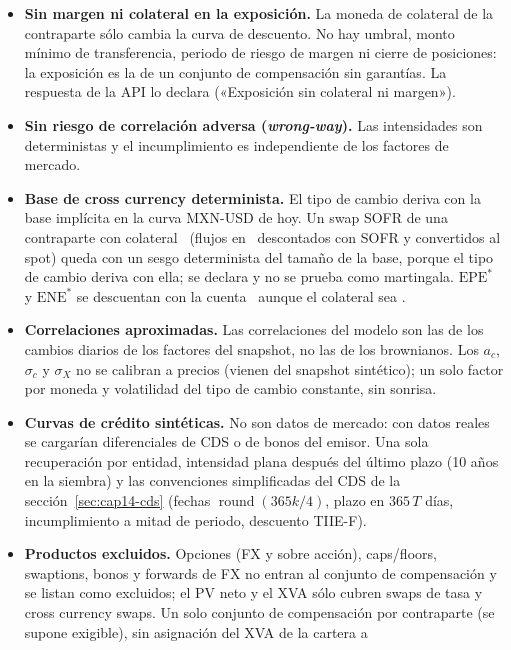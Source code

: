 \begin{limites}
  \begin{itemize}
    \item \textbf{Sin margen ni colateral en la exposición.} La moneda de colateral de la contraparte sólo cambia la
          curva de descuento. No hay umbral, monto mínimo de transferencia, periodo de riesgo de margen ni cierre de
          posiciones: la exposición es la de un conjunto de compensación sin garantías. La respuesta de la API lo declara
          («Exposición sin colateral ni margen»).
    \item \textbf{Sin riesgo de correlación adversa (\emph{wrong-way}).} Las intensidades son deterministas y el incumplimiento es
          independiente de los factores de mercado.
    \item \textbf{Base de cross currency determinista.} El tipo de cambio deriva con la base implícita en la curva MXN-USD de hoy.
          Un swap SOFR de una contraparte con colateral \MXN\ (flujos en \USD\ descontados con SOFR y convertidos al spot)
          queda con un sesgo determinista del tamaño de la base, porque el tipo de cambio deriva con ella; se declara y no se prueba
          como martingala. $\mathrm{EPE}^*$ y $\mathrm{ENE}^*$ se descuentan con la cuenta \cTIIE\ aunque el colateral sea \USD.
    \item \textbf{Correlaciones aproximadas.} Las correlaciones del modelo son las de los cambios diarios de los factores del snapshot,
          no las de los brownianos. Los $a_c$, $\sigma_c$ y $\sigma_X$ no se calibran a precios (vienen del snapshot sintético); un solo factor por
          moneda y volatilidad del tipo de cambio constante, sin sonrisa.
    \item \textbf{Curvas de crédito sintéticas.} No son datos de mercado: con datos reales se cargarían diferenciales de CDS o de bonos del
          emisor. Una sola recuperación por entidad, intensidad plana después del último plazo (10 años en la siembra) y las
          convenciones simplificadas del CDS de la sección~\ref{sec:cap14-cds} (fechas $\operatorname{round}(365k/4)$, plazo en $365\,T$
          días, incumplimiento a mitad de periodo, descuento TIIE-F).
    \item \textbf{Productos excluidos.} Opciones (FX y sobre acción), caps/floors, swaptions, bonos y forwards de FX no entran
          al conjunto de compensación y se listan como excluidos; el PV neto y el XVA sólo cubren swaps de tasa y cross currency
          swaps. Un solo conjunto de compensación por contraparte (se supone exigible), sin asignación del XVA de la cartera a

\end{itemize}
\end{limites}

